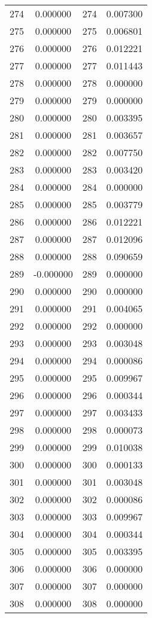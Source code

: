 \documentclass[12pt]{article}
\begin{document}
\begin{longtable}{@{}cccc@{}}
274 & 0.000000 & 274 & 0.007300 \\
275 & 0.000000 & 275 & 0.006801 \\
276 & 0.000000 & 276 & 0.012221 \\
277 & 0.000000 & 277 & 0.011443 \\
278 & 0.000000 & 278 & 0.000000 \\
279 & 0.000000 & 279 & 0.000000 \\
280 & 0.000000 & 280 & 0.003395 \\
281 & 0.000000 & 281 & 0.003657 \\
282 & 0.000000 & 282 & 0.007750 \\
283 & 0.000000 & 283 & 0.003420 \\
284 & 0.000000 & 284 & 0.000000 \\
285 & 0.000000 & 285 & 0.003779 \\
286 & 0.000000 & 286 & 0.012221 \\
287 & 0.000000 & 287 & 0.012096 \\
288 & 0.000000 & 288 & 0.090659 \\
289 & -0.000000 & 289 & 0.000000 \\
290 & 0.000000 & 290 & 0.000000 \\
291 & 0.000000 & 291 & 0.004065 \\
292 & 0.000000 & 292 & 0.000000 \\
293 & 0.000000 & 293 & 0.003048 \\
294 & 0.000000 & 294 & 0.000086 \\
295 & 0.000000 & 295 & 0.009967 \\
296 & 0.000000 & 296 & 0.000344 \\
297 & 0.000000 & 297 & 0.003433 \\
298 & 0.000000 & 298 & 0.000073 \\
299 & 0.000000 & 299 & 0.010038 \\
300 & 0.000000 & 300 & 0.000133 \\
301 & 0.000000 & 301 & 0.003048 \\
302 & 0.000000 & 302 & 0.000086 \\
303 & 0.000000 & 303 & 0.009967 \\
304 & 0.000000 & 304 & 0.000344 \\
305 & 0.000000 & 305 & 0.003395 \\
306 & 0.000000 & 306 & 0.000000 \\
307 & 0.000000 & 307 & 0.000000 \\
308 & 0.000000 & 308 & 0.000000 \\

\end{longtable}
\end{document}
